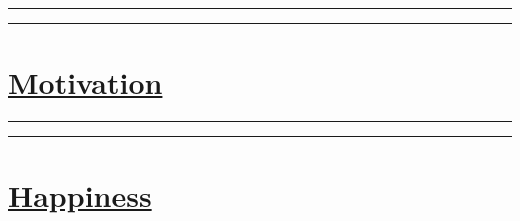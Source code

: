 \documentclass[11pt]{article}
\begin{document}
\begin{multicols}{2}
\begin{flushleft}
\rule{125pt}{1pt}\vline\rule{125pt}{1pt}
\end{flushleft}


\section*{\underline{Motivation}}
\vfill\null
\vfill\null
\begin{flushleft}
\rule{125pt}{1pt}\vline\rule{125pt}{1pt}
\end{flushleft}



\section*{\underline{Happiness}}
\vfill\null
\smallskip
\vfill\null

\end{multicols}
 
\end{document}
